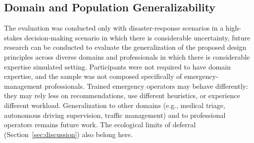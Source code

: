 \documentclass[journal]{IEEEtran}
\theoremstyle{plain}
\theoremstyle{definition}
\providecommand{\DIFaddtex}[1]{{\protect\color{blue} \sf #1}} %
\providecommand{\DIFdeltex}[1]{{\protect\color{red} \scriptsize #1}} %
\providecommand{\DIFaddbegin}{} %
\providecommand{\DIFaddend}{} %
\providecommand{\DIFdelbegin}{} %
\providecommand{\DIFdelend}{} %
\providecommand{\DIFadd}[1]{\texorpdfstring{\DIFaddtex{#1}}{#1}} %
\providecommand{\DIFdel}[1]{\texorpdfstring{\DIFdeltex{#1}}{}} %
\newcommand{\DIFscaledelfig}{0.5}
\newlength{\DIFdelgraphicswidth} %
\newlength{\DIFdelgraphicsheight} %
\newcommand{\DIFaddincludegraphics}[2][]{{\color{blue}\fbox{\DIFOincludegraphics[#1]{#2}}}} %
\newcommand{\DIFdelincludegraphics}[2][]{%
\sbox{\DIFdelgraphicsbox}{\DIFOincludegraphics[#1]{#2}}%
\settoboxwidth{\DIFdelgraphicswidth}{\DIFdelgraphicsbox} %
\settoboxtotalheight{\DIFdelgraphicsheight}{\DIFdelgraphicsbox} %
\scalebox{\DIFscaledelfig}{%
\parbox[b]{\DIFdelgraphicswidth}{\usebox{\DIFdelgraphicsbox}\\[-\baselineskip] \rule{\DIFdelgraphicswidth}{0em}}\llap{\resizebox{\DIFdelgraphicswidth}{\DIFdelgraphicsheight}{%
\setlength{\unitlength}{\DIFdelgraphicswidth}%
\begin{picture}(1,1)%
\thicklines\linethickness{2pt} %
{\color[rgb]{1,0,0}\put(0,0){\framebox(1,1){}}}%
{\color[rgb]{1,0,0}\put(0,0){\line( 1,1){1}}}%
{\color[rgb]{1,0,0}\put(0,1){\line(1,-1){1}}}%
\end{picture}%
}\hspace*{3pt}}} %
} %
\DeclareRobustCommand{\DIFaddbegin}{\DIFOaddbegin \let\includegraphics\DIFaddincludegraphics} %
\DeclareRobustCommand{\DIFaddend}{\DIFOaddend \let\includegraphics\DIFOincludegraphics} %
\DeclareRobustCommand{\DIFdelbegin}{\DIFOdelbegin \let\includegraphics\DIFdelincludegraphics} %
\DeclareRobustCommand{\DIFdelend}{\DIFOaddend \let\includegraphics\DIFOincludegraphics} %
\begin{document}
    \subsection{\DIFadd{Domain and Population Generalizability}}
    \DIFadd{The evaluation was conducted only with disaster-response scenarios in }\DIFaddend a \DIFdelbegin \DIFdel{high-stakes decision-making scenario in which there is considerable uncertainty, future research can be conducted to evaluate the generalization of the proposed design principles across diverse domains and professionals in which there is considerable expertise}\DIFdelend \DIFaddbegin \DIFadd{simulated setting. Participants were not required to have domain expertise, and the sample was not composed specifically of emergency-management professionals. Trained emergency operators may behave differently: they may rely less on recommendations, use different heuristics, or experience different workload. Generalization to other domains (e.g., medical triage, autonomous driving supervision, traffic management) and to professional operators remains future work. The ecological limits of deferral (Section~\ref{sec:discussion}) also belong here.
}
\end{document}
